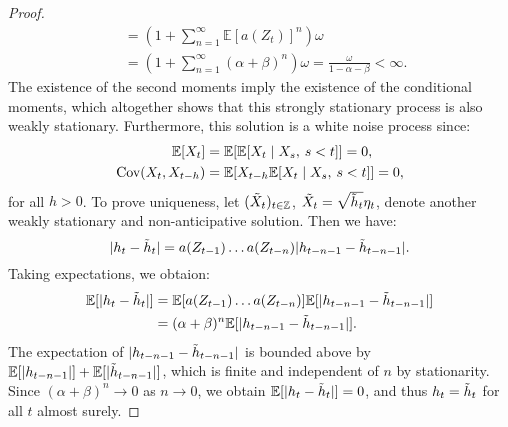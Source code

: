 \begin{proof}
\begin{align*}
    & = \left(1+\sum_{n=1}^{\infty}\mathbb{E}[a(Z_{t})]^{n}\right)\omega\\
    & = \left(1+\sum_{n=1}^{\infty}(\alpha+\beta)^{n}\right)\omega=\frac{\omega}{1-\alpha-\beta}<\infty.
\end{align*}
The existence of the second moments imply the existence of the conditional moments, which altogether shows that this strongly stationary process is also weakly stationary. 
Furthermore, this solution is a white noise process since:
\begin{align*}
    \mathbb{E}[X_{t}] & =\mathbb{E}\left[\mathbb{E}[X_{t} \mid X_{s},\hspace{2 pt} s<t]\right]=0,\\
    \textrm{Cov}(X_{t}, X_{t-h})& =\mathbb{E}\left[X_{t-h}\mathbb{E}[X_{t}\mid X_{s},\hspace{2 pt} s<t]\right]=0,
\end{align*}
for all $h>0$. To prove uniqueness, let $(\Tilde{X}_{t})_{t\in\mathbb{Z}}$,\hspace{2 pt} $\Tilde{X}_{t}=\sqrt{\Tilde{h}_{t}}\eta_{t}$, denote another weakly stationary and non-anticipative solution. Then we have:
\begin{equation}
    |h_{t}-\Tilde{h}_{t}|=a(Z_{t-1})\dots a(Z_{t-n})|h_{t-n-1}-\Tilde{h}_{t-n-1}|.
\end{equation}
Taking expectations, we obtaion: 
\begin{align}
    \mathbb{E}[|h_{t}-\Tilde{h}_{t}|]& =\mathbb{E}[a(Z_{t-1})\dots a(Z_{t-n})]\mathbb{E}[|h_{t-n-1}-\Tilde{h}_{t-n-1}|]\\
    & = (\alpha +\beta)^{n}\mathbb{E}[|h_{t-n-1}-\Tilde{h}_{t-n-1}|].
\end{align}
The expectation of $|h_{t-n-1}-\Tilde{h}_{t-n-1}|$ is bounded above by $\mathbb{E}[|h_{t-n-1}|]+\mathbb{E}[|\Tilde{h}_{t-n-1}|]$, which is finite and independent of $n$ by stationarity. Since $(\alpha+\beta)^{n}\to 0$ as $n\to 0$, we obtain $\mathbb{E}[|h_{t}-\Tilde{h}_{t}|]=0$, and thus $h_{t}=\Tilde{h}_{t}$ for all $t$ almost surely.
\end{proof}


